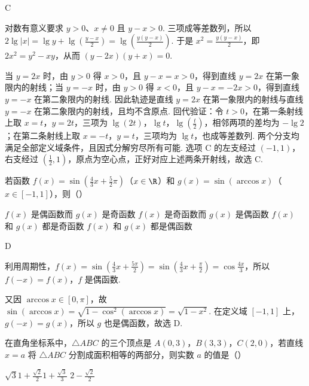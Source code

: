 \begin{answer}
C
\end{answer}

\begin{solution}
对数有意义要求 \(y>0\)、\(x\neq0\) 且 \(y-x>0\). 三项成等差数列，所以
\(2\lg|x|=\lg y+\lg\left(\frac{y-x}{2}\right)=\lg\left(\frac{y(y-x)}{2}\right)\). 于是
\(x^{2}=\frac{y(y-x)}{2}\)，即
\(2x^{2}=y^{2}-xy\)，从而
\((y-2x)(y+x)=0\).

当 \(y=2x\) 时，由 \(y>0\) 得 \(x>0\)，且 \(y-x=x>0\)，得到直线 \(y=2x\) 在第一象限内的射线；当 \(y=-x\) 时，由 \(y>0\) 得 \(x<0\)，且 \(y-x=-2x>0\)，得到直线 \(y=-x\) 在第二象限内的射线. 因此轨迹是直线 \(y=2x\) 在第一象限内的射线与直线 \(y=-x\) 在第二象限内的射线，且均不含原点. 回代验证：令 \(t>0\)，在第一条射线上取 \(x=t\)，\(y=2t\)，三项为 \(\lg\left(2t\right)\)，\(\lg t\)，\(\lg\left(\frac{t}{2}\right)\)，相邻两项的差均为 \(-\lg2\)；在第二条射线上取 \(x=-t\)，\(y=t\)，三项均为 \(\lg t\)，也成等差数列. 两个分支均满足全部定义域条件，且因式分解穷尽所有可能. 选项 C 的左支经过 \(\left(-1,1\right)\)，右支经过 \(\left(\frac12,1\right)\)，原点为空心点，正好对应上述两条开射线，故选 C.
\end{solution}

\begin{problem}

若函数 \(f(x)=\sin\left(\frac{4}{3}x+\frac{5}{2}\pi\right) \)（\(x\in\R\)）和 \(g(x)=\sin(\arccos x) \)（\(x\in[-1,1]\)），则（\quad）

\choices
{\(f(x) \) 是偶函数而 \(g(x) \) 是奇函数}
{\(f(x) \) 是奇函数而 \(g(x) \) 是偶函数}
{\(f(x) \) 和 \(g(x) \) 都是奇函数}
{\(f(x) \) 和 \(g(x) \) 都是偶函数}
\end{problem}

\begin{answer}
D
\end{answer}

\begin{solution}
利用周期性，\(f(x)=\sin\left(\frac{4}{3}x+\frac{5\pi}{2}\right)=\sin\left(\frac{4}{3}x+\frac{\pi}{2}\right)=\cos\frac{4x}{3}\)，所以 \(f(-x)=f(x)\)，\(f\) 是偶函数.

又因 \(\arccos x\in[0,\pi]\)，故 \(\sin(\arccos x)=\sqrt{1-\cos^{2}(\arccos x)}=\sqrt{1-x^{2}}\). 在定义域 \([-1,1]\) 上，\(g(-x)=g(x)\)，所以 \(g\) 也是偶函数，故选 D.
\end{solution}

\begin{problem}

在直角坐标系中，\(\triangle ABC\) 的三个顶点是 \(A(0,3)\)，\(B(3,3)\)，\(C(2,0)\)，若直线 \(x=a\) 将 \(\triangle ABC\) 分割成面积相等的两部分，则实数 \(a\) 的值是（\quad）

\choices
{\(\sqrt{3} \)}{\(1+\frac{\sqrt{2}}{2} \)}{\(1+\frac{\sqrt{3}}
{3} \)}
{\(2-\frac{\sqrt{2}}
{2} \)}
\end{problem}

